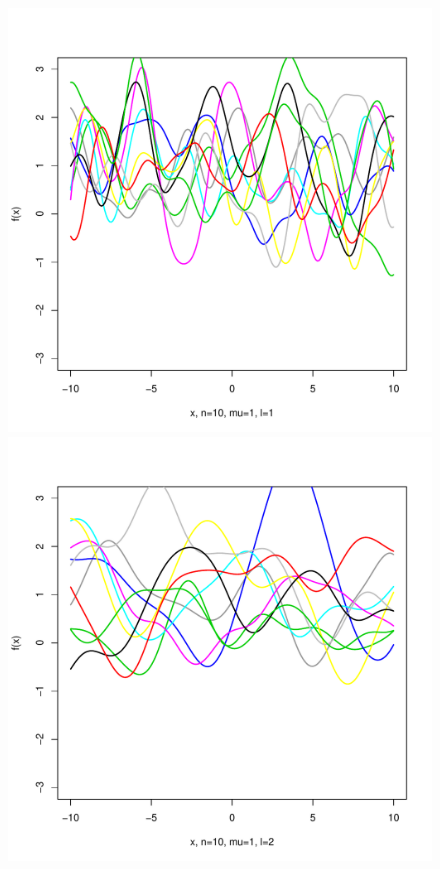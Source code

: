 \documentclass[12pt,letterpaper]{article}
\begin{document}
\begin{figure}
\begin{center}
\includegraphics[scale=0.2]{hw321/n10-m1-l1.pdf}
\includegraphics[scale=0.2]{hw321/n10-m1-l2.pdf}

\end{center}
\end{figure}
\end{document}
